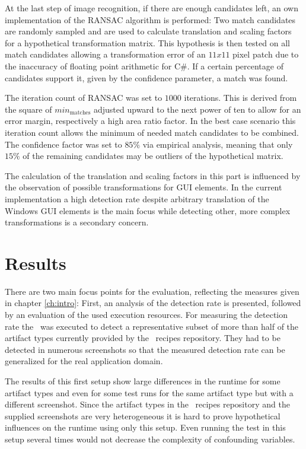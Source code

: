 At the last step of image recognition, if there are enough candidates left, an own implementation of the RANSAC algorithm is performed: Two match candidates are randomly sampled and are used to calculate translation and scaling factors for a hypothetical transformation matrix. This hypothesis is then tested on all match candidates allowing a transformation error of an $11x11$ pixel patch due to the inaccuracy of floating point arithmetic for C\#. If a certain percentage of candidates support it, given by the confidence parameter, a match was found.

The iteration count of RANSAC was set to $1000$ iterations. This is derived from the square of $min_{\text{matches}}$ adjusted upward to the next power of ten to allow for an error margin, respectively a high area ratio factor. In the best case scenario this iteration count allows the minimum of needed match candidates to be combined. The confidence factor was set to $85\%$ via empirical analysis, meaning that only $15\%$ of the remaining candidates may be outliers of the hypothetical matrix.

The calculation of the translation and scaling factors in this part is influenced by the observation of possible transformations for GUI elements. In the current implementation a high detection rate despite arbitrary translation of the Windows GUI elements is the main focus while detecting other, more complex transformations is a secondary concern.

\chapter{Results}\label{ch:results}

There are two main focus points for the evaluation, reflecting the measures given in chapter \ref{ch:intro}: First, an analysis of the detection rate is presented, followed by an evaluation of the used execution resources. For measuring the detection rate the \vd~was executed to detect a representative subset of more than half of the artifact types currently provided by the \ape~recipes repository. They had to be detected in numerous screenshots so that the measured detection rate can be generalized for the real application domain.

The results of this first setup show large differences in the runtime for some artifact types and even for some test runs for the same artifact type but with a different screenshot. Since the artifact types in the \ape~recipes repository and the supplied screenshots are very heterogeneous it is hard to prove hypothetical influences on the runtime using only this setup. Even running the test in this setup several times would not decrease the complexity of confounding variables.

